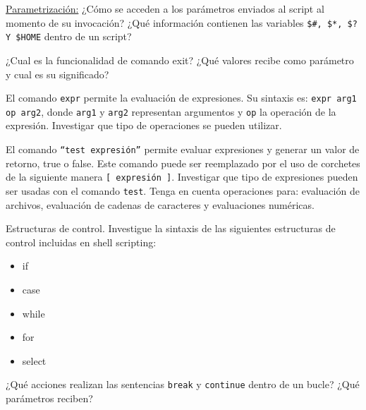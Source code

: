 \begin{questions}

\item \underline{Parametrización:} ¿Cómo se acceden a los parámetros enviados al script al momento de su invocación? ¿Qué información contienen las variables \texttt{\$\#, \$*, \$? Y \$HOME} dentro de un script?

\item ¿Cual es la funcionalidad de comando exit? ¿Qué valores recibe como parámetro y cual es su significado?

\item El comando \texttt{expr} permite la evaluación de expresiones. Su sintaxis es: \texttt{expr arg1 op arg2}, donde \texttt{arg1} y \texttt{arg2} representan argumentos y \texttt{op} la operación de la expresión. Investigar que tipo de operaciones se pueden utilizar.

\item El comando \texttt{“test expresión”} permite evaluar expresiones y generar un valor de retorno, true o false. Este comando puede ser reemplazado por el uso de corchetes de la siguiente manera \texttt{[ expresión ]}. Investigar que tipo de expresiones pueden ser usadas con el comando \texttt{test}. Tenga en cuenta operaciones para: evaluación de archivos, evaluación de cadenas de caracteres y evaluaciones numéricas.

\item Estructuras de control. Investigue la sintaxis de las siguientes estructuras de control
incluidas en shell scripting:
\begin{itemize}
\item if
\item case
\item while
\item for
\item select
\end{itemize}

\item ¿Qué acciones realizan las sentencias \texttt{break} y \texttt{continue} dentro de un bucle? ¿Qué parámetros reciben?


\end{questions}
